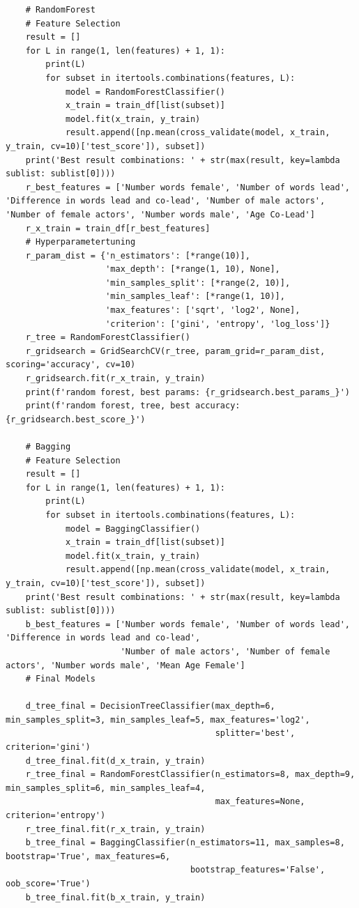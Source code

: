 \documentclass{article}
\begin{document}
\begin{verbatim}
    # RandomForest
    # Feature Selection
    result = []
    for L in range(1, len(features) + 1, 1):
        print(L)
        for subset in itertools.combinations(features, L):
            model = RandomForestClassifier()
            x_train = train_df[list(subset)]
            model.fit(x_train, y_train)
            result.append([np.mean(cross_validate(model, x_train, y_train, cv=10)['test_score']), subset])
    print('Best result combinations: ' + str(max(result, key=lambda sublist: sublist[0])))
    r_best_features = ['Number words female', 'Number of words lead', 'Difference in words lead and co-lead', 'Number of male actors', 'Number of female actors', 'Number words male', 'Age Co-Lead']
    r_x_train = train_df[r_best_features]
    # Hyperparametertuning
    r_param_dist = {'n_estimators': [*range(10)],
                    'max_depth': [*range(1, 10), None],
                    'min_samples_split': [*range(2, 10)],
                    'min_samples_leaf': [*range(1, 10)],
                    'max_features': ['sqrt', 'log2', None],
                    'criterion': ['gini', 'entropy', 'log_loss']}
    r_tree = RandomForestClassifier()
    r_gridsearch = GridSearchCV(r_tree, param_grid=r_param_dist, scoring='accuracy', cv=10)
    r_gridsearch.fit(r_x_train, y_train)
    print(f'random forest, best params: {r_gridsearch.best_params_}')
    print(f'random forest, tree, best accuracy: {r_gridsearch.best_score_}')

    # Bagging
    # Feature Selection
    result = []
    for L in range(1, len(features) + 1, 1):
        print(L)
        for subset in itertools.combinations(features, L):
            model = BaggingClassifier()
            x_train = train_df[list(subset)]
            model.fit(x_train, y_train)
            result.append([np.mean(cross_validate(model, x_train, y_train, cv=10)['test_score']), subset])
    print('Best result combinations: ' + str(max(result, key=lambda sublist: sublist[0])))
    b_best_features = ['Number words female', 'Number of words lead', 'Difference in words lead and co-lead',
                       'Number of male actors', 'Number of female actors', 'Number words male', 'Mean Age Female']
    # Final Models

    d_tree_final = DecisionTreeClassifier(max_depth=6, min_samples_split=3, min_samples_leaf=5, max_features='log2',
                                          splitter='best', criterion='gini')
    d_tree_final.fit(d_x_train, y_train)
    r_tree_final = RandomForestClassifier(n_estimators=8, max_depth=9, min_samples_split=6, min_samples_leaf=4,
                                          max_features=None, criterion='entropy')
    r_tree_final.fit(r_x_train, y_train)
    b_tree_final = BaggingClassifier(n_estimators=11, max_samples=8, bootstrap='True', max_features=6,
                                     bootstrap_features='False', oob_score='True')
    b_tree_final.fit(b_x_train, y_train)


\end{verbatim}
\end{document}

